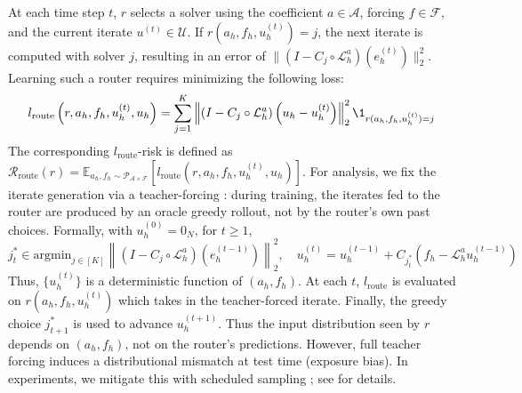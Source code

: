 \documentclass{article} %
\begin{document}
At each time step $t$, $r$ selects a solver using the coefficient $a \in \mathcal{A}$, forcing $f \in \mathcal{F}$, and the current iterate $u^{(t)} \in \mathcal{U}$. If $r(a_h, f_h, u^{(t)}_h) = j$, the next iterate is computed with solver $j$, resulting in an error of $\|( I - C_{j} \circ  \mathcal{L}_{h}^a)(e^{(t)}_h)\|^2_2$. Learning such a router requires minimizing the following loss:
\begin{equation} \label{eq:routerloss}
    l_{\text{route}}\left(r, a_h, f_h, u^{(t)}_h, u_h\right) = \sum_{j = 1}^K \left\|\left( I - C_{j} \circ \mathcal{L}_{h}^a\right)\left(u_h - u^{(t)}_h\right)\right\|^2_2\1_{r(a_h, f_h, u^{(t)}_h) = j}
\end{equation}
The corresponding $l_{\text{route}}$-risk is defined as $\mathcal{R}_{\text{route}}\left(r\right) = \mathbb{E}_{a_h, f_h \sim \mathcal{P}_{\mathcal{A} \times \mathcal{F}}}[l_{\text{route}}(r, a_h, f_h, u^{(t)}_h, u_h)]$.  
For analysis, we fix the iterate generation via a teacher-forcing \citep{williams1989learning,lamb2016professor}: during training, 
the iterates fed to the router are produced by an oracle greedy rollout, not by the router's own past choices. Formally, with $u_h^{(0)} = 0_N$, for $t \geq 1$, 
$$j^*_t \in \text{argmin}_{j \in [K]} \left\|\left( I - C_{j} \circ \mathcal{L}_{h}^a\right)\left(e^{(t - 1)}_h\right)\right\|^2_2, \quad u^{(t)}_h = u^{(t - 1)}_h + C_{j^{*}_t}\left(f_h - \mathcal{L}_h^a u_h^{(t - 1)}\right)$$
Thus, $\{u^{(t)}_h\}$ is a deterministic function of $(a_h, f_h)$. At each $t$, $l_{\text{route}}$ is evaluated on $r(a_h, f_h, u^{(t)}_h)$ which takes in the teacher-forced iterate. Finally, the greedy choice $j^*_{t + 1}$ is used to advance $u^{(t + 1)}_h$. Thus the input distribution seen by $r$ depends on $(a_h, f_h)$, not on the router's predictions. However, full teacher forcing induces a distributional mismatch at test time (exposure bias). In experiments, we mitigate this with scheduled sampling \citep{bengio2015scheduled}; see  for details.

\end{document}

